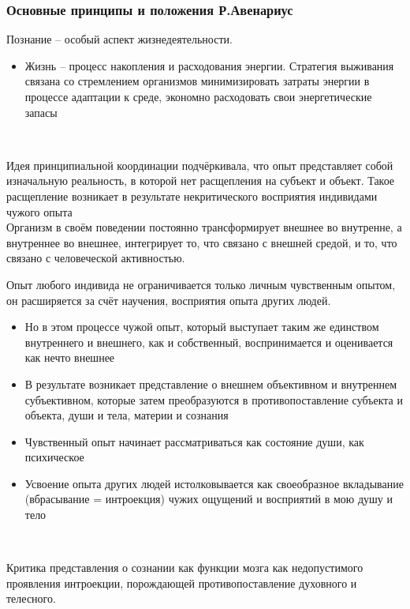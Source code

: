 \documentclass[main.tex]{subfiles}
\begin{document}
\subsubsection{Основные принципы и положения Р.Авенариус}

{\parindent0pt
Познание -- особый аспект жизнедеятельности.
\begin{itemize}[nosep,leftmargin=0.5cm]
\item Жизнь -- процесс накопления и расходования энергии.
Стратегия выживания связана со стремлением организмов минимизировать затраты энергии в процессе адаптации к среде, экономно расходовать свои энергетические запасы
\end{itemize}
}
\ 

{\parindent0pt
Идея принципиальной координации подчёркивала, что опыт представляет собой изначальную реальность, в которой нет расщепления на субъект и объект.
Такое расщепление возникает в результате некритического восприятия индивидами чужого опыта
}
\ \\

{\parindent0pt
Организм в своём поведении постоянно трансформирует внешнее во внутренне, а внутреннее во внешнее, интегрирует то, что связано с внешней средой, и то, что связано с человеческой активностью.
}
\ \\

{\parindent0pt
Опыт любого индивида не ограничивается только личным чувственным опытом, он расширяется за счёт научения, восприятия опыта других людей.
\begin{itemize}[nosep,leftmargin=0.5cm]
\item Но в этом процессе чужой опыт, который выступает таким же единством внутреннего и внешнего, как и собственный, воспринимается и оценивается как нечто внешнее
\item В результате возникает представление о внешнем объективном и внутреннем субъективном, которые затем преобразуются в противопоставление субъекта и объекта, души и тела, материи и сознания
\item Чувственный опыт начинает рассматриваться как состояние души, как психическое
\item Усвоение опыта других людей истолковывается как своеобразное вкладывание (вбрасывание = интроекция) чужих ощущений и восприятий в мою душу и тело
\end{itemize}
}
\ 

{\parindent0pt
Критика представления о сознании как функции мозга как недопустимого проявления интроекции, порождающей противопоставление духовного и телесного.
}
\ \\
\end{document}
